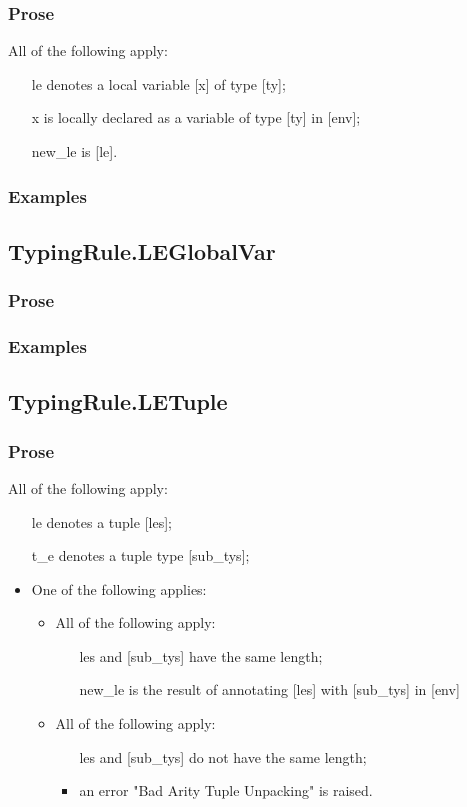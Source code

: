 \documentclass{book}
\begin{document}
   \subsubsection{Prose}
   All of the following apply:
   \begin{itemize}
   \item [le] denotes a local variable [x] of type [ty];
   \item [x] is locally declared as a variable of type [ty] in [env];
   \item [new\_le] is [le].
   \end{itemize}

    \subsubsection{Examples}

\subsection{TypingRule.LEGlobalVar}

    \subsubsection{Prose}

    \subsubsection{Examples}

\subsection{TypingRule.LETuple}

    \subsubsection{Prose}
    All of the following apply:
   \begin{itemize}
   \item [le] denotes a tuple [les];
   \item [t\_e] denotes a tuple type [sub\_tys];
   \item  One of the following applies:
     \begin{itemize}
     \item  All of the following apply:
       \begin{itemize}
       \item [les] and [sub\_tys] have the same length;
       \item [new\_le] is the result of annotating [les] with [sub\_tys] in [env]
       \end{itemize}
     \item  All of the following apply:
       \begin{itemize}
       \item  [les] and [sub\_tys] do not have the same length;
       \item  an error "Bad Arity Tuple Unpacking" is raised.
       \end{itemize}
     \end{itemize}
   \end{itemize}
\end{document}
